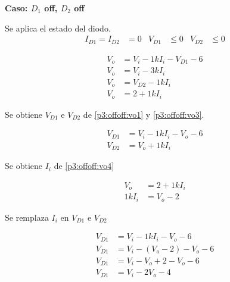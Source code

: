 %
%
%

\bigskip

\textbf{Caso: $D_1$ off, $D_2$ off}

Se aplica el estado del diodo.
\begin{align*}
  I_{D1} = I_{D2} &= 0
  &
  V_{D1} &\leq 0
  &
  V_{D2} &\leq 0
\end{align*}

\begin{align}
  V_o &= V_i - 1k I_i - V_{D1} - 6 \label{p3:offoff:vo1}
  \\
  V_o &= V_i - 3k I_i \label{p3:offoff:vo2}
  \\
  V_o &= V_{D2} - 1k I_i \label{p3:offoff:vo3}
  \\
  V_o &= 2 + 1k I_i \label{p3:offoff:vo4}
\end{align}

Se obtiene $V_{D1}$ e $V_{D2}$ de \ref{p3:offoff:vo1} y \ref{p3:offoff:vo3}.

\begin{align*}
  V_{D1} &= V_i - 1k I_i - V_o - 6
  \\
  V_{D2} &= V_o + 1k I_i
\end{align*}

Se obtiene $I_i$ de \ref{p3:offoff:vo4}

\begin{align*}
  V_o &= 2 + 1k I_i
  \\
  1k I_i &= V_o - 2
\end{align*}

Se remplaza $I_i$ en $V_{D1}$ e $V_{D2}$

\begin{align*}
  V_{D1} &= V_i - 1k I_i - V_o - 6
  \\
  V_{D1} &= V_i - \left(V_o - 2\right) - V_o - 6
  \\
  V_{D1} &= V_i - V_o + 2 - V_o - 6
  \\
  V_{D1} &= V_i - 2 V_o - 4
\end{align*}

